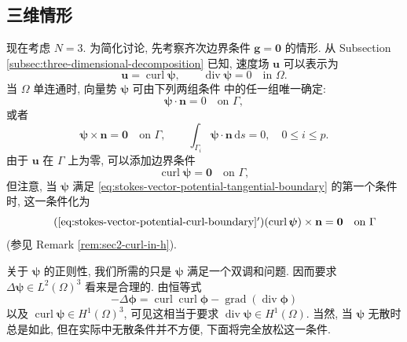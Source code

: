 \subsection{三维情形}
\label{subsec:stokes-three-dimensional-vector-potential}

现在考虑 $N=3$. 为简化讨论, 先考察齐次边界条件
$\mathbf{g}=\mathbf{0}$ 的情形. 从 Subsection
\ref{subsec:three-dimensional-decomposition} 已知, 速度场
$\mathbf{u}$ 可以表示为
\[
\mathbf{u}=\operatorname{curl}\boldsymbol{\psi},
\qquad
\operatorname{div}\boldsymbol{\psi}=0
\quad\text{in }\Omega.
\]
当 $\Omega$ 单连通时, 向量势 $\boldsymbol{\psi}$ 可由下列两组条件
中的任一组唯一确定:
\begin{equation}\label{eq:stokes-vector-potential-normal-boundary}
\boldsymbol{\psi}\cdot\mathbf{n}=0
\quad\text{on }\Gamma,
\end{equation}
或者
\begin{equation}\label{eq:stokes-vector-potential-tangential-boundary}
\boldsymbol{\psi}\times\mathbf{n}=\mathbf{0}
\quad\text{on }\Gamma,
\qquad
\int_{\Gamma_i}\boldsymbol{\psi}\cdot\mathbf{n}\,\mathrm{d}s=0,
\quad 0\le i\le p.
\end{equation}
由于 $\mathbf{u}$ 在 $\Gamma$ 上为零, 可以添加边界条件
\begin{equation}\label{eq:stokes-vector-potential-curl-boundary}
\operatorname{curl}\boldsymbol{\psi}=\mathbf{0}
\quad\text{on }\Gamma,
\end{equation}
但注意, 当 $\boldsymbol{\psi}$ 满足
\eqref{eq:stokes-vector-potential-tangential-boundary} 的第一个条件时,
这一条件化为
\begin{equation}\tag{\ref*{eq:stokes-vector-potential-curl-boundary}$'$}
\label{eq:stokes-vector-potential-curl-tangential-boundary}
(\operatorname{curl}\boldsymbol{\psi})\times\mathbf{n}
=\mathbf{0}
\quad\text{on }\Gamma
\end{equation}
(参见 Remark \ref{rem:sec2-curl-in-h}).

关于 $\boldsymbol{\psi}$ 的正则性, 我们所需的只是
$\boldsymbol{\psi}$ 满足一个双调和问题. 因而要求
$\Delta\boldsymbol{\psi}\in L^2(\Omega)^3$ 看来是合理的.
由恒等式
\begin{equation}\label{eq:stokes-vector-laplacian-decomposition}
-\Delta\boldsymbol{\phi}
=
\operatorname{curl}\operatorname{curl}\boldsymbol{\phi}
-\operatorname{grad}(\operatorname{div}\boldsymbol{\phi})
\end{equation}
以及
$\operatorname{curl}\boldsymbol{\psi}\in H^1(\Omega)^3$,
可见这相当于要求
$\operatorname{div}\boldsymbol{\psi}\in H^1(\Omega)$.
当然, 当 $\boldsymbol{\psi}$ 无散时总是如此,
但在实际中无散条件并不方便, 下面将完全放松这一条件.

